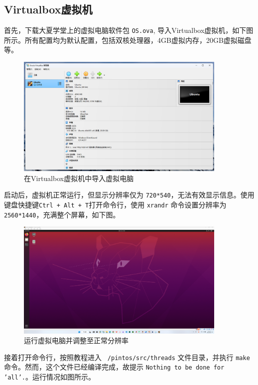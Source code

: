 \documentclass{article}
\begin{document}
\subsection{Virtualbox虚拟机}

首先，下载大夏学堂上的虚拟电脑软件包 \texttt{OS.ova}, 导入Virtualbox虚拟机，如下图所示。所有配置均为默认配置，包括双核处理器，4GB虚拟内存，20GB虚拟磁盘等。

\begin{figure}[H]
	\centering
	\includegraphics[width=0.9\textwidth]{img/virtualbox_computer_loaded.png}
	\caption{在Virtualbox虚拟机中导入虚拟电脑}
\end{figure}

启动后，虚拟机正常运行，但显示分辨率仅为 \texttt{720*540}，无法有效显示信息。使用键盘快捷键\texttt{Ctrl + Alt + T}打开命令行，使用 \texttt{xrandr} 命令设置分辨率为 \texttt{2560*1440}，充满整个屏幕，如下图。

\begin{figure}[H]
	\centering
	\includegraphics[width=0.9\textwidth]{img/ubuntu_desktop_virtualbox.png}
	\caption{运行虚拟电脑并调整至正常分辨率}
\end{figure}

接着打开命令行，按照教程进入 \texttt{~/pintos/src/threads} 文件目录，并执行 \texttt{make} 命令。然而，这个文件已经编译完成，故提示 \texttt{Nothing to be done for 'all'.}。运行情况如图所示。
\end{document}
